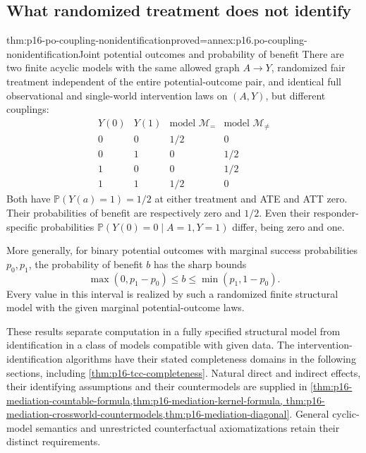 \subsection{What randomized treatment does not identify}

\begin{hbtheorem}{thm:p16-po-coupling-nonidentification}{proved=annex:p16.po-coupling-nonidentification}{Joint potential outcomes and probability of benefit}
There are two finite acyclic models with the same allowed graph
\(A\to Y\), randomized fair treatment independent of the entire
potential-outcome pair, and identical full observational and
single-world intervention laws on \((A,Y)\), but different couplings:
\[
\begin{array}{cc|cc}
 Y(0)&Y(1)&\text{model }\mathcal M_{=}&\text{model }\mathcal M_{\ne}\\\hline
 0&0&1/2&0\\
 0&1&0&1/2\\
 1&0&0&1/2\\
 1&1&1/2&0
\end{array}
\]
Both have \(\mathbb P(Y(a)=1)=1/2\) at either treatment and
ATE and ATT zero. Their probabilities of benefit are respectively
zero and \(1/2\). Even their responder-specific probabilities
\(\mathbb P(Y(0)=0\mid A=1,Y=1)\) differ, being zero and one.

More generally, for binary potential outcomes with marginal success
probabilities \(p_0,p_1\), the probability of benefit \(b\)
has the sharp bounds
\[
 \max(0,p_1-p_0)\leq b\leq\min(p_1,1-p_0).
\]
Every value in this interval is realized by such a randomized finite
structural model with the given marginal potential-outcome laws.
\end{hbtheorem}

These results separate computation in a fully specified structural
model from identification in a class of models compatible with given
data. The intervention-identification algorithms have their stated
completeness domains in the following sections, including
\cref{thm:p16-tcc-completeness}.
Natural direct and indirect effects, their identifying assumptions
and their countermodels are supplied in
\cref{thm:p16-mediation-countable-formula,thm:p16-mediation-kernel-formula,
thm:p16-mediation-crossworld-countermodels,thm:p16-mediation-diagonal}.
General cyclic-model semantics and unrestricted counterfactual
axiomatizations retain their distinct requirements.
